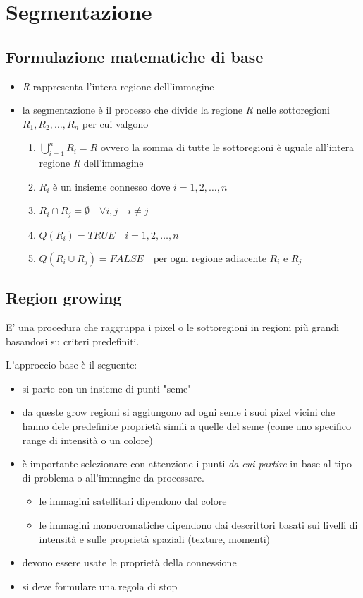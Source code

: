 \chapter{Segmentazione}

\section{Formulazione matematiche di base}

\begin{itemize}
	\item \textit{R} rappresenta l'intera regione dell'immagine
	\item la segmentazione è il processo che divide la regione \textit{R} nelle sottoregioni $R_1, R_2, \dots, R_n$ per cui valgono
	\begin{enumerate}
		\item $\bigcup_{i=1}^{n} R_i = R$ \quad ovvero la somma di tutte le sottoregioni è uguale all'intera regione \textit{R} dell'immagine
		
		\item $R_i$ è un insieme \gls{connesso} dove $i = 1, 2, \dots, n$
		\item $R_i \cap R_j = \emptyset \quad \forall i,j \quad i \neq j$
		\item $Q(R_i) = TRUE \quad i = 1, 2, \dots, n$
		\item $Q(R_i \cup R_j) = FALSE \quad \text{per ogni regione adiacente } R_i$ e $R_j$
	\end{enumerate}
\end{itemize}

\section{Region growing}
E' una procedura che raggruppa i pixel o le sottoregioni in regioni più grandi basandosi su criteri predefiniti.

L'approccio base è il seguente:

\begin{itemize}
	\item si parte con un insieme di punti "seme"
	\item da queste grow regioni si aggiungono ad ogni seme i suoi pixel vicini che hanno dele predefinite proprietà simili a quelle del seme (come uno specifico range di intensità o un colore)
	\item è importante selezionare con attenzione i punti \textit{da cui partire} in base al tipo di problema o all'immagine da processare.
	\begin{itemize}
			\item le immagini satellitari dipendono dal colore
			\item le immagini monocromatiche dipendono dai descrittori basati sui livelli di intensità e sulle proprietà spaziali (texture, momenti)
	\end{itemize}
	
	\item devono essere usate le proprietà della connessione
	\item si deve formulare una regola di stop
\end{itemize}

